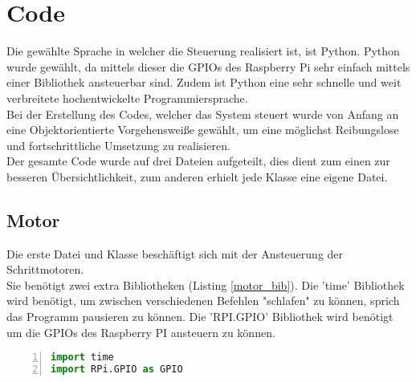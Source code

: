 
\chapter{Code}
Die gewählte Sprache in welcher die Steuerung realisiert ist, ist Python. Python wurde gewählt, da mittels dieser die \acp{GPIO} des Raspberry Pi sehr einfach mittels einer Bibliothek ansteuerbar sind. Zudem ist Python eine sehr schnelle und weit verbreitete hochentwickelte Programmiersprache.\\
Bei der Erstellung des Codes, welcher das System steuert wurde von Anfang an eine Objektorientierte Vorgehensweiße gewählt, um eine möglichst Reibungslose und fortschrittliche Umsetzung zu realisieren.\\
Der gesamte Code wurde auf drei Dateien aufgeteilt, dies dient zum einen zur besseren Übersichtlichkeit, zum anderen erhielt jede Klasse eine eigene Datei.
\section{Motor}
Die erste Datei und Klasse beschäftigt sich mit der Ansteuerung der Schrittmotoren.\\
Sie benötigt zwei extra Bibliotheken (Listing \ref{motor_bib}). Die 'time' Bibliothek wird benötigt, um zwischen verschiedenen Befehlen "schlafen" zu können, sprich das Programm pausieren zu können. Die 'RPI.GPIO' Bibliothek wird benötigt um die \acp{GPIO} des Raspberry PI ansteuern zu können. 
\begin{lstlisting}[caption={Bibliotheken der Motor Klasse}, language={Python}, label={motor_bib}, numbers=left]
import time
import RPi.GPIO as GPIO	
\end{lstlisting}

